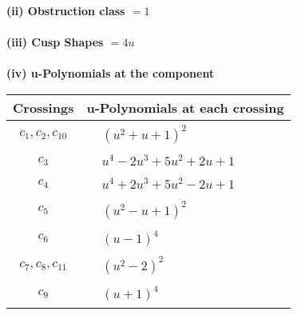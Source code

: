 \documentclass[1p]{elsarticle_modified}
\theoremstyle{definition}
\begin{document}
\flushleft \textbf{(ii) Obstruction class $= 1$}\\~\\
\flushleft \textbf{(iii) Cusp Shapes $= 4 u$}\\~\\
\newpage\renewcommand{\arraystretch}{1}
\flushleft \textbf{(iv) u-Polynomials at the component}\newline \\
\begin{tabular}{m{50pt}|m{274pt}}
Crossings & \hspace{64pt}u-Polynomials at each crossing \\
\hline $$\begin{aligned}c_{1},c_{2},c_{10}\end{aligned}$$&$\begin{aligned}
&(u^2+u+1)^2
\end{aligned}$\\
\hline $$\begin{aligned}c_{3}\end{aligned}$$&$\begin{aligned}
&u^4-2 u^3+5 u^2+2 u+1
\end{aligned}$\\
\hline $$\begin{aligned}c_{4}\end{aligned}$$&$\begin{aligned}
&u^4+2 u^3+5 u^2-2 u+1
\end{aligned}$\\
\hline $$\begin{aligned}c_{5}\end{aligned}$$&$\begin{aligned}
&(u^2- u+1)^2
\end{aligned}$\\
\hline $$\begin{aligned}c_{6}\end{aligned}$$&$\begin{aligned}
&(u-1)^4
\end{aligned}$\\
\hline $$\begin{aligned}c_{7},c_{8},c_{11}\end{aligned}$$&$\begin{aligned}
&(u^2-2)^2
\end{aligned}$\\
\hline $$\begin{aligned}c_{9}\end{aligned}$$&$\begin{aligned}
&(u+1)^4
\end{aligned}$\\
\hline
\end{tabular}\\~\\
\end{document}
